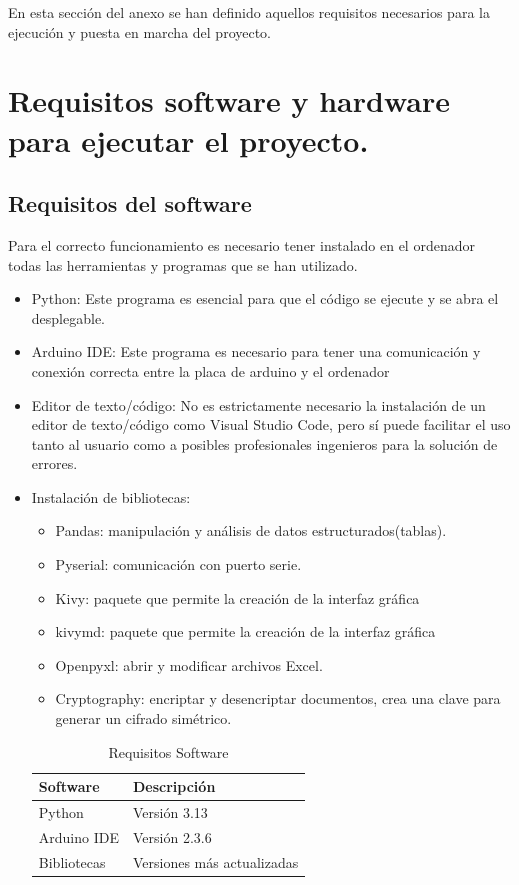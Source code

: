 En esta sección del anexo se han definido aquellos requisitos necesarios para la ejecución y puesta en marcha del proyecto. 
\section{Requisitos software y hardware para ejecutar el proyecto.}
\subsection{Requisitos del software}
Para el correcto funcionamiento es necesario tener instalado en el ordenador todas las herramientas y programas que se han utilizado. 
\begin{itemize}
    \item Python: Este programa es esencial para que el código se ejecute y se abra el desplegable.
    \item Arduino IDE: Este programa es necesario para tener una comunicación y conexión correcta entre la placa de arduino y el ordenador 
    \item Editor de texto/código: No es estrictamente necesario la instalación de un editor de texto/código como Visual Studio Code, pero sí puede facilitar el uso tanto al usuario como a posibles profesionales ingenieros para la solución de errores.
    \item Instalación de bibliotecas:
    \begin{itemize}
        \item Pandas: manipulación y análisis de datos estructurados(tablas).
        \item Pyserial: comunicación con puerto serie.
        \item Kivy: paquete que permite la creación de la interfaz gráfica
        \item kivymd: paquete que permite la creación de la interfaz gráfica
        \item Openpyxl: abrir y modificar archivos Excel.
        \item Cryptography: encriptar y desencriptar documentos, crea una clave para generar un cifrado simétrico.
    \end{itemize}

\begin{table}[]
\centering
\begin{tabular}{|l|l|}
\hline
\rowcolor[HTML]{BFBFBF} 
\textbf{Software} & \textbf{Descripción} \\ \hline
Python & Versión 3.13\\ \hline
Arduino IDE & Versión 2.3.6\\ \hline
Bibliotecas & Versiones más actualizadas\\ \hline
\end{tabular}
\caption{Requisitos Software}
\label{tab:Requisitos_Software}
\end{table}
\end{itemize}
